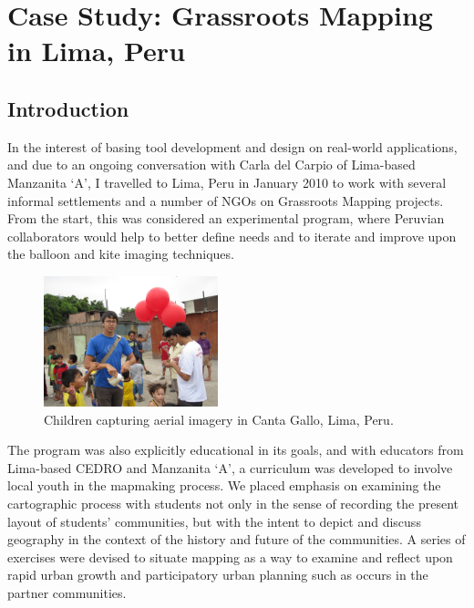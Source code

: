 \documentclass[11pt,oneside,notitlepage]{report}
\begin{document}
\chapter{Case Study: Grassroots Mapping in Lima, Peru}
\label{chap:peru}

\section{Introduction}

In the interest of basing tool development and design on real-world applications, and due to an ongoing conversation with Carla del Carpio of Lima-based Manzanita `A', I travelled to Lima, Peru in January 2010 to work with several informal settlements and a number of NGOs on Grassroots Mapping projects. From the start, this was considered an experimental program, where Peruvian collaborators would help to better define needs and to iterate and improve upon the balloon and kite imaging techniques.

\begin{figure}
	\begin{flushright}
		\includegraphics[width=0.45\textwidth]{images/kids-canta-gallo.jpg}
		\caption{Children capturing aerial imagery in Canta Gallo, Lima, Peru.}
	\end{flushright}
\end{figure}

The program was also explicitly educational in its goals, and with educators from Lima-based \ac{CEDRO} and Manzanita `A', a curriculum was developed to involve local youth in the mapmaking process. We placed emphasis on examining the cartographic process with students not only in the sense of recording the present layout of students' communities, but with the intent to depict and discuss geography in the context of the history and future of the communities. A series of exercises were devised to situate mapping as a way to examine and reflect upon rapid urban growth and participatory urban planning such as occurs in the partner communities.
\end{document}
